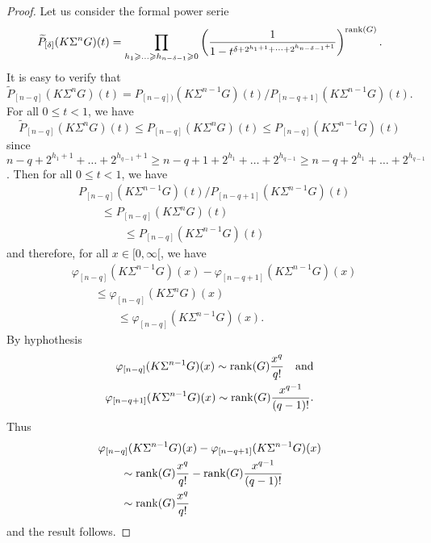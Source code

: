 \begin{proof}
Let us consider the formal power serie
$$
\widetilde{P}_{[\delta]}(K\Sigma^n G)(t)=\prod_{h_1\geq\dots\geq h_{n-\delta-1}\geq0}\left({1\over1-t^{\delta+2^{h_1+1}+\dots+2^{h_{n-\delta-1}+1}}}\right)^{\rk(G)}.
$$
It is easy to verify that
$$
\widetilde{P}_{[n-q]}(K\Sigma^n G)(t)=P_{[n-q])}(K\Sigma^{n-1}G)(t)/P_{[n-q+1]}(K\Sigma^{n-1}G)(t).
$$
For all $0\leq t<1$, we have
$$
\widetilde{P}_{[n-q]}(K\Sigma^n G)(t)\leq P_{[n-q]}(K\Sigma^n G)(t)\leq P_{[n-q]}(K\Sigma^{n-1}G)(t)
$$ since $n-q+2^{h_1+1}+\dots+2^{h_{q-1}+1}\geq n-q+1+2^{h_1}+\dots+2^{h_{q-1}}\geq n-q+2^{h_1}+\dots+2^{h_{q-1}}$. Then for all $0\leq t<1$, we have
\begin{align*}
&P_{[n-q]}(K\Sigma^{n-1}G)(t)/P_{[n-q+1]}(K\Sigma^{n-1}G)(t)\\
&\qquad\leq P_{[n-q]}(K\Sigma^n G)(t)\\
&\qquad\qquad\leq P_{[n-q]}(K\Sigma^{n-1}G)(t)
\end{align*} and therefore, for all $x\in[0,\infty[$, we have
\begin{align*}
&\varphi_{[n-q]}(K\Sigma^{n-1}G)(x)-\varphi_{[n-q+1]}(K\Sigma^{n-1}G)(x)\\
&\qquad\leq\varphi_{[n-q]}(K\Sigma^n G)(x)\\
&\qquad\qquad\leq\varphi_{[n-q]}(K\Sigma^{n-1}G)(x).
\end{align*}
By hyphothesis 
\begin{align*}
\varphi_{[n-q]}(K\Sigma^{n-1}G)(x)\sim \rk(G){x^q\over q!}\text{\ \ \ and}\\
\varphi_{[n-q+1]}(K\Sigma^{n-1}G)(x)\sim \rk(G){x^{q-1}\over (q-1)!}. 
\end{align*}
Thus
\begin{align*}
&\varphi_{[n-q]}(K\Sigma^{n-1}G)(x)-\varphi_{[n-q+1]}(K\Sigma^{n-1}G)(x)\\
&\qquad\sim \operatorname{rank}(G){x^q\over q!}-\operatorname{rank}(G){x^{q-1}\over (q-1)!}\\
&\qquad\sim \operatorname{rank}(G){x^q\over q!}
\end{align*}
and the result follows.
\end{proof}

